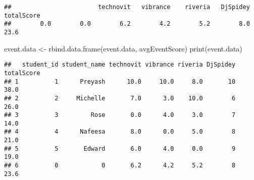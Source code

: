 \documentclass[
]{article}
\newenvironment{Shaded}{\begin{snugshade}}{\end{snugshade}}
\newcommand{\FunctionTok}[1]{\textcolor[rgb]{0.00,0.00,0.00}{#1}}
\newcommand{\NormalTok}[1]{#1}
\newcommand{\OtherTok}[1]{\textcolor[rgb]{0.56,0.35,0.01}{#1}}
\begin{document}
\begin{verbatim}
##                        technovit   vibrance    riveria   DjSpidey totalScore 
##        0.0        0.0        6.2        4.2        5.2        8.0       23.6
\end{verbatim}

\begin{Shaded}
\begin{Highlighting}[]
\NormalTok{event.data }\OtherTok{\textless{}{-}} \FunctionTok{rbind.data.frame}\NormalTok{(event.data, avgEventScore)}
\FunctionTok{print}\NormalTok{(event.data)}
\end{Highlighting}
\end{Shaded}

\begin{verbatim}
##   student_id student_name technovit vibrance riveria DjSpidey totalScore
## 1          1      Preyash      10.0     10.0     8.0       10       38.0
## 2          2     Michelle       7.0      3.0    10.0        6       26.0
## 3          3         Rose       0.0      4.0     3.0        7       14.0
## 4          4      Nafeesa       8.0      0.0     5.0        8       21.0
## 5          5       Edward       6.0      4.0     0.0        9       19.0
## 6          0            0       6.2      4.2     5.2        8       23.6
\end{verbatim}
\end{document}
